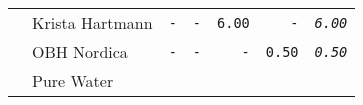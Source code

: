 \documentclass[11pt,A4paper,]{article}
\begin{document}
\begin{longtable}[]{@{}llrrrrr@{}}
\begin{minipage}[t]{0.14\columnwidth}
\strut
\end{minipage} & \begin{minipage}[t]{0.14\columnwidth}\raggedright\strut
Krista Hartmann\strut
\end{minipage} & \begin{minipage}[t]{0.14\columnwidth}\raggedleft\strut
\texttt{-}\strut
\end{minipage} & \begin{minipage}[t]{0.14\columnwidth}\raggedleft\strut
\texttt{-}\strut
\end{minipage} & \begin{minipage}[t]{0.14\columnwidth}\raggedleft\strut
\texttt{6.00}\strut
\end{minipage} & \begin{minipage}[t]{0.14\columnwidth}\raggedleft\strut
\texttt{-}\strut
\end{minipage} & \begin{minipage}[t]{0.14\columnwidth}\raggedleft\strut
\emph{\texttt{6.00}}\strut
\end{minipage}\tabularnewline
\begin{minipage}[t]{0.14\columnwidth}\raggedright\strut
\strut
\end{minipage} & \begin{minipage}[t]{0.14\columnwidth}\raggedright\strut
OBH Nordica\strut
\end{minipage} & \begin{minipage}[t]{0.14\columnwidth}\raggedleft\strut
\texttt{-}\strut
\end{minipage} & \begin{minipage}[t]{0.14\columnwidth}\raggedleft\strut
\texttt{-}\strut
\end{minipage} & \begin{minipage}[t]{0.14\columnwidth}\raggedleft\strut
\texttt{-}\strut
\end{minipage} & \begin{minipage}[t]{0.14\columnwidth}\raggedleft\strut
\texttt{0.50}\strut
\end{minipage} & \begin{minipage}[t]{0.14\columnwidth}\raggedleft\strut
\emph{\texttt{0.50}}\strut
\end{minipage}\tabularnewline
\begin{minipage}[t]{0.14\columnwidth}\raggedright\strut
\strut
\end{minipage} & \begin{minipage}[t]{0.14\columnwidth}\raggedright\strut
Pure Water\strut
\end{minipage} & \begin{minipage}[t]{0.14\columnwidth}\raggedleft\strut

\end{minipage}
\end{longtable}
\end{document}
